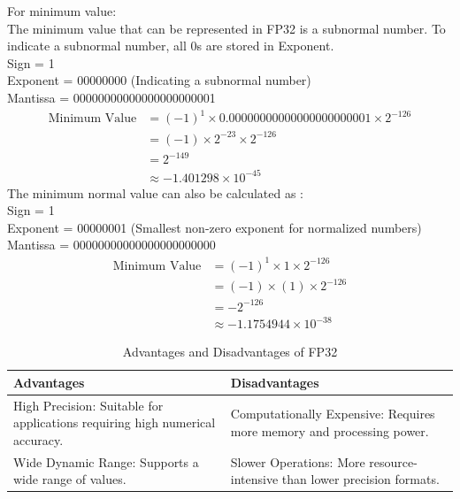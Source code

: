 \documentclass{ioereport}
\begin{document}
\begin{enumerate}[label=\textbf{\roman*.}]
    For minimum value:\\
    The minimum value that can be represented in FP32 is a subnormal number. To indicate a subnormal number, all 0s are stored in Exponent. \\
    Sign = 1 \\
    Exponent = 00000000 (Indicating a subnormal number)\\
    Mantissa = 00000000000000000000001
    \[
        \begin{aligned}
            \text{Minimum Value} &= (-1)^{1} \times 0.00000000000000000000001 \times 2^{-126} \\
            & = (-1) \times 2^{-23} \times 2^{-126} \\
            & =  2^{-149} \\
            & \approx -1.401298 \times 10^{-45}
        \end{aligned}
    \]
    The minimum normal value can also be calculated as : \\
    Sign = 1 \\
    Exponent = 00000001 (Smallest non-zero exponent for normalized numbers)\\
    Mantissa = 00000000000000000000000
    \[
        \begin{aligned}
            \text{Minimum Value} &= (-1)^{1} \times 1 \times 2^{-126} \\
            & = (-1) \times (1) \times 2^{-126} \\
            & =  -2^{-126} \\
            & \approx -1.1754944 \times 10^{-38}
        \end{aligned}
    \]

    \begin{table}[H]
        \centering
        \caption{Advantages and Disadvantages of FP32}
        \label{tab:fp32}
        \begin{tabular}{|p{6cm}|p{6cm}|}
        \hline
        \textbf{Advantages} & \textbf{Disadvantages} \\
        \hline
        High Precision: Suitable for applications requiring high numerical accuracy. & Computationally Expensive: Requires more memory and processing power. \\
        \hline
        Wide Dynamic Range: Supports a wide range of values. & Slower Operations: More resource-intensive than lower precision formats. \\
        \hline
        \end{tabular}
    \end{table}


\end{enumerate}
\end{document}
